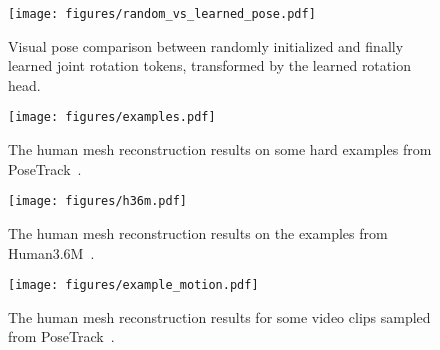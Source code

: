 \begin{figure}
	\centering
	\texttt{[image: figures/random\_vs\_learned\_pose.pdf]}
	\caption{Visual pose comparison between randomly initialized and finally learned joint rotation tokens, transformed by the learned rotation head.}
	\label{fig:random_vs_learned}
\end{figure}

\begin{figure}
	\centering
	\texttt{[image: figures/examples.pdf]}
	\caption{The human mesh reconstruction results on some hard examples from PoseTrack~\citep{posetrack:andriluka2018posetrack}.}
	\label{fig:examples}
\end{figure}



\begin{figure}[h]
	\centering
	\texttt{[image: figures/h36m.pdf]}
	\caption{The human mesh reconstruction results on the examples from Human3.6M~\citep{h36m:ionescu2013human3}.}
	\label{fig:h36m}
\end{figure}

\begin{figure}[h]
	\centering
	\texttt{[image: figures/example\_motion.pdf]}
	\caption{The human mesh reconstruction results for some video clips sampled from PoseTrack~\citep{posetrack:andriluka2018posetrack}.}
	\label{fig:example_motion}
\end{figure}


